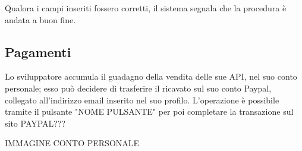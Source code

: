 Qualora i campi inseriti fossero corretti, il sistema segnala che la procedura è andata a buon fine.

\subsection{Pagamenti}
Lo sviluppatore accumula il guadagno della vendita delle sue API, nel suo conto personale; esso può decidere di trasferire il ricavato sul suo conto Paypal, collegato all'indirizzo email inserito nel suo profilo.
L'operazione è possibile tramite il pulsante "NOME PULSANTE" per poi completare la transazione sul sito PAYPAL???

IMMAGINE CONTO PERSONALE
